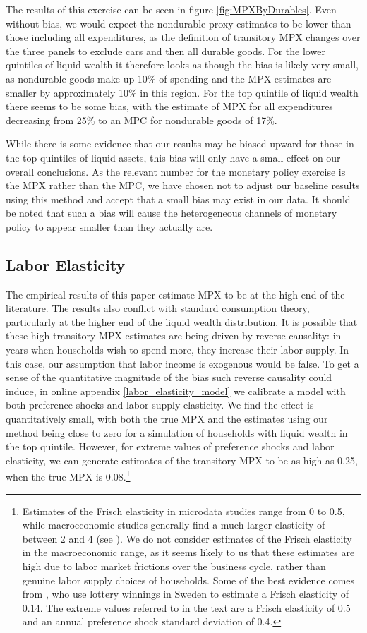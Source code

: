 \documentclass[titlepage]{\econtex}\newcommand{\texname}{ConsumptionHeterogeneity}
\begin{document}
The results of this exercise can be seen in figure \ref{fig:MPXByDurables}. Even without bias, we would expect the nondurable proxy estimates to be lower than those including all expenditures, as the definition of transitory MPX changes over the three panels to exclude cars and then all durable goods. For the lower quintiles of liquid wealth it therefore looks as though the bias is likely very small, as nondurable goods make up 10\% of spending and the MPX estimates are smaller by approximately 10\% in this region. For the top quintile of liquid wealth there seems to be some bias, with the estimate of MPX for all expenditures decreasing from 25\% to an MPC for nondurable goods of 17\%.

While there is some evidence that our results may be biased upward for those in the top quintiles of liquid assets, this bias will only have a small effect on our overall conclusions. As the relevant number for the monetary policy exercise is the MPX rather than the MPC, we have chosen not to adjust our baseline results using this method and accept that a small bias may exist in our data. It should be noted that such a bias will cause the heterogeneous channels of monetary policy to appear smaller than they actually are.

\subsection{Labor Elasticity} \label{labor_elasticity}
The empirical results of this paper estimate MPX to be at the high end of the literature. The results also conflict with standard consumption theory, particularly at the higher end of the liquid wealth distribution. It is possible that these high transitory MPX estimates are being driven by reverse causality: in years when households wish to spend more, they increase their labor supply. In this case, our assumption that labor income is exogenous would be false. To get a sense of the quantitative magnitude of the bias such reverse causality could induce, in online appendix \ref{labor_elasticity_model} we calibrate a model with both preference shocks and labor supply elasticity. We find the effect is quantitatively small, with both the true MPX and the estimates using our method being close to zero for a simulation of households with liquid wealth in the top quintile. However, for extreme values of preference shocks and labor elasticity, we can generate estimates of the transitory MPX to be as high as 0.25, when the true MPX is 0.08.\footnote{Estimates of the Frisch elasticity in microdata studies range from 0 to 0.5, while macroeconomic studies generally find a much larger elasticity of between 2 and 4 (see \cite{peterman_reconciling_2016}). We do not consider estimates of the Frisch elasticity in the macroeconomic range, as it seems likely to us that these estimates are high due to labor market frictions over the business cycle, rather than genuine labor supply choices of households. Some of the best evidence comes from \cite{cesarini_effect_2017}, who use lottery winnings in Sweden to estimate a Frisch elasticity of 0.14. The extreme values referred to in the text are a Frisch elasticity of 0.5 and an annual preference shock standard deviation of 0.4.}
\end{document}

